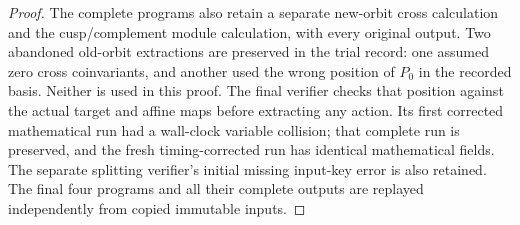 \begin{proof}
The complete programs also retain a separate new-orbit
cross calculation and the cusp/complement module
calculation, with every original output. Two abandoned
old-orbit extractions are preserved in the trial record:
one assumed zero cross coinvariants, and another used
the wrong position of \(P_0\) in the recorded basis.
Neither is used in this proof. The final verifier
checks that position against the actual target and
affine maps before extracting any action. Its first
corrected mathematical run had a wall-clock variable
collision; that complete run is preserved, and the
fresh timing-corrected run has identical mathematical
fields. The separate splitting verifier's initial
missing input-key error is also retained. The final
four programs and all their complete outputs are
replayed independently from copied immutable inputs.
\end{proof}
